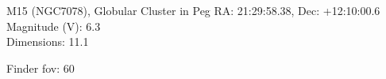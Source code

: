 \begin{block}{M15 (NGC7078), Globular Cluster in Peg}
    RA: 21:29:58.38, Dec: +12:10:00.6 \\ 
    Magnitude (V): 6.3 \\ 
    Dimensions: 11.1 

    Finder fov: 60 
\end{block}